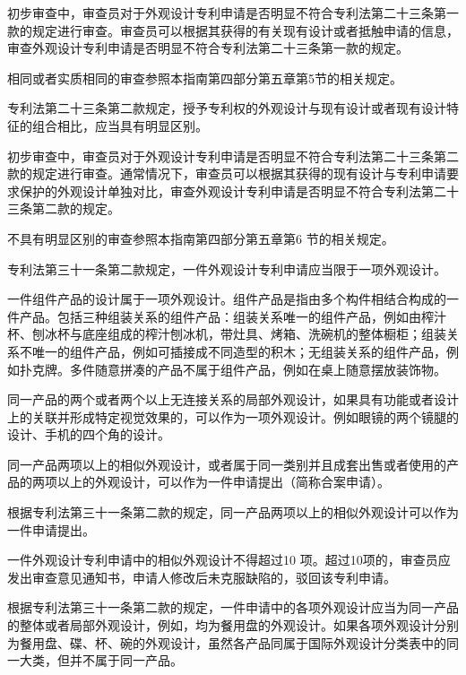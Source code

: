 初步审查中，审查员对于外观设计专利申请是否明显不符合专利法第二十三条第一款的规定进行审查。审查员可以根据其获得的有关现有设计或者抵触申请的信息，审查外观设计专利申请是否明显不符合专利法第二十三条第一款的规定。

相同或者实质相同的审查参照本指南第四部分第五章第5节的相关规定。

专利法第二十三条第二款规定，授予专利权的外观设计与现有设计或者现有设计特征的组合相比，应当具有明显区别。

初步审查中，审查员对于外观设计专利申请是否明显不符合专利法第二十三条第二款的规定进行审查。通常情况下，审查员可以根据其获得的现有设计与专利申请要求保护的外观设计单独对比，审查外观设计专利申请是否明显不符合专利法第二十三条第二款的规定。

不具有明显区别的审查参照本指南第四部分第五章第6 节的相关规定。

专利法第三十一条第二款规定，一件外观设计专利申请应当限于一项外观设计。

一件组件产品的设计属于一项外观设计。组件产品是指由多个构件相结合构成的一件产品。包括三种组装关系的组件产品：组装关系唯一的组件产品，例如由榨汁杯、刨冰杯与底座组成的榨汁刨冰机，带灶具、烤箱、洗碗机的整体橱柜；组装关系不唯一的组件产品，例如可插接成不同造型的积木；无组装关系的组件产品，例如扑克牌。多件随意拼凑的产品不属于组件产品，例如在桌上随意摆放装饰物。

同一产品的两个或者两个以上无连接关系的局部外观设计，如果具有功能或者设计上的关联并形成特定视觉效果的，可以作为一项外观设计。例如眼镜的两个镜腿的设计、手机的四个角的设计。

同一产品两项以上的相似外观设计，或者属于同一类别并且成套出售或者使用的产品的两项以上的外观设计，可以作为一件申请提出（简称合案申请）。

根据专利法第三十一条第二款的规定，同一产品两项以上的相似外观设计可以作为一件申请提出。

一件外观设计专利申请中的相似外观设计不得超过10 项。超过10项的，审查员应发出审查意见通知书，申请人修改后未克服缺陷的，驳回该专利申请。

根据专利法第三十一条第二款的规定，一件申请中的各项外观设计应当为同一产品的整体或者局部外观设计，例如，均为餐用盘的外观设计。如果各项外观设计分别为餐用盘、碟、杯、碗的外观设计，虽然各产品同属于国际外观设计分类表中的同一大类，但并不属于同一产品。

